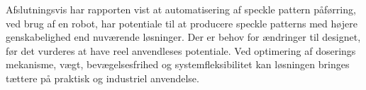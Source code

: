 Afslutningsvis har rapporten vist at automatisering af speckle pattern påførring, ved brug af en robot, har potentiale til at producere speckle patterns med højere genskabelighed end nuværende løsninger. Der er behov for ændringer til designet, før det vurderes at have reel anvendleses potentiale. Ved optimering af doserings mekanisme, vægt, bevægelsesfrihed og systemfleksibilitet kan løsningen bringes tættere på praktisk og industriel anvendelse.




\begin{comment}
 - Speckle pattern på 3D objekter.\\
- Større arbejdsområde \\
- Robot arm i stedet for lineær bevægelse \\
- T-slots nedfræset i bundpladen til indspænding\\
- Kortere bolte til indspænding, så de ikke går så langt udover bundpladen, hvis det er et stort emne.\\
- Bruge bælter istedet, fordi vi nu har en motor der også skal devæges, hvilket også skaber usikkerhed. \\
-Punkter til vægtbesparelse\\
-Kamera placering\\
- Placering af lineær bevægelse ovenpå den nedserte del (fjerne sidder og toppen), men fravalgt pga. af tidsmangel\\
- Alle led skal smøres, aå vi kunne lige så godt have brugt en ball screw istedet\\
- Undvære følgestænger, fordi der ikke er behov for en sikkerhedsfaktor på 5


   En anden udviklingsmulighed knytter sig til intergration af avanceret sensorik. I den nuværende opstilling sker fåførigne ud fra forudefinerede positioner uden realtidsfeedback. 
\end{comment}

